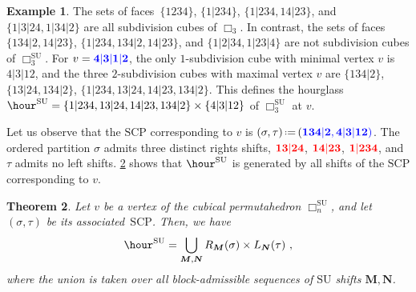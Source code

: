 \documentclass{amsart}
\newcommand{\red}{\color{red}} %
\newcommand{\blue}{\color{blue}} %
\newtheorem{theorem}{Theorem}[section]
\theoremstyle{definition}
\newtheorem{example}[theorem]{Example}
\renewcommand{\b}[1]{{\boldsymbol{#1}}} %
\newcommand{\eqdef}{\mbox{\,\raisebox{0.2ex}{\scriptsize\ensuremath{\mathrm:}}\ensuremath{=}\,}} %
\renewcommand{\b}[1]{\boldsymbol{#1}} %
\newcommand{\SU}{\mathrm{SU}}
\newcommand{\SCP}{\mathrm{SCP}}
\newcommand{\divcube}[1]{\Box_{#1}}
\begin{document}
\begin{example}
\label{ex:subdivision cubes}
The sets of faces~$\{1234\}$, $\{1|234\}$, $\{1|234, 14|23\}$, and $\{1|3|24,1|34|2\}$ are all subdivision cubes of $\divcube{3}$.
In contrast, the sets of faces $\{134|2, 14|23\}$, $\{1|234, 134|2, 14|23\}$, and $\{1|2|34,1|23|4\}$
are not subdivision cubes of $\divcube{3}^\SU$.
For $v = \blue{\mathbf{4|3|1|2}}$, the only $1$-subdivision cube with minimal vertex $v$ is $4|3|12$, and the three $2$-subdivision cubes with maximal vertex $v$ are $\{134|2\}$, $\{13|24, 134|2\}$, $\{ 1|234, 13|24, 14|23, 134|2\}$.
This defines the hourglass $\hour^\SU=\{ 1|234, 13|24, 14|23, 134|2\} \times \{4|3|12\}$ of $\divcube{3}^\SU$ at $v$.

Let us observe that the $\SCP$ corresponding to $v$ is $(\sigma,\tau) \eqdef (\blue{\mathbf{134|2}},\blue{\mathbf{4|3|12}} )$.
The ordered partition $\sigma$ admits three distinct rights shifts, $\red{\mathbf{13|24}}$, $\red{\mathbf{14|23}}$, $\red{\mathbf{1|234}}$, and $\tau$ admits no left shifts.
\cref{thm:cubical-SU} shows that $\hour^\SU$ is generated by all shifts of the $\SCP$ corresponding to $v$.
\end{example}

\begin{theorem}
	\label{thm:cubical-SU}
	Let $v$ be a vertex of the cubical permutahedron $\divcube{n}^\SU$, and let $(\sigma,\tau)$ be its associated~$\SCP$. 
	Then, we have 
	\[ \hour^\SU = \bigcup_{\b{M},\b{N}}R_{\b{M}}(\sigma) \times L_{\b{N}}(\tau) \ , \]
where the union is taken over all block-admissible sequences of $\SU$ shifts $\b{M},\b{N}$.
\end{theorem}
\end{document}
